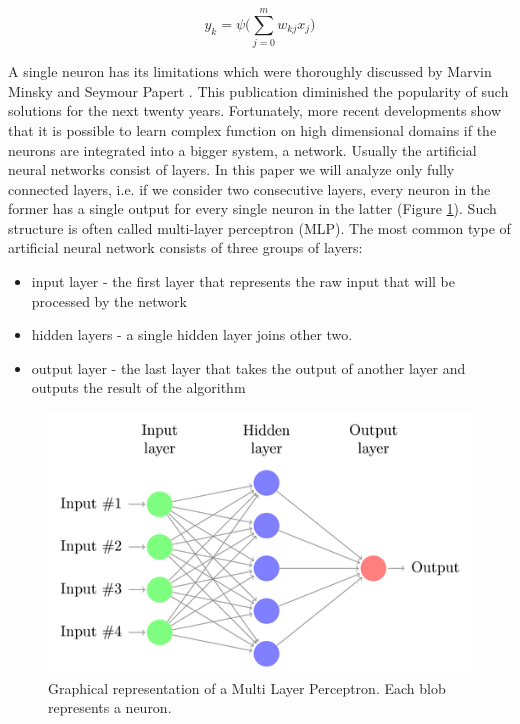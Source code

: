 \documentclass{pracamgr}
\begin{document}
\begin{equation}
y_k = \psi\bigg(\sum_{j=0}^{m}w_{kj}x_{j}\bigg) 
\end{equation}

A single neuron has its limitations which were thoroughly discussed
by Marvin Minsky and Seymour Papert \citep{Min69}. This publication diminished
the popularity of such solutions for the next twenty years. Fortunately, more recent
developments show that it is possible to learn complex function on high dimensional
domains if the neurons are integrated into a bigger system, a network. Usually
the artificial neural networks consist of layers. In this paper we will
analyze only fully connected layers, i.e. if we consider two consecutive layers,
every neuron in the former has a single output for every single neuron in the latter
(Figure \ref{fig:fig31}).
Such structure is often called multi-layer perceptron (MLP).
The most common type of artificial neural network consists of three groups of layers:

\begin{itemize}
    \item input layer - the first layer that represents the raw input that will be
    processed by the network
    \item hidden layers - a single hidden layer joins other two.
    \item output layer - the last layer that takes the output of another layer
    and outputs the result of the algorithm
\end{itemize}



\begin{figure}[H]
\includegraphics[width=\textwidth]{figures/fig31}
\caption{Graphical representation of a Multi Layer Perceptron. Each blob
represents a neuron.}
\label{fig:fig31}
\end{figure}
\end{document}
